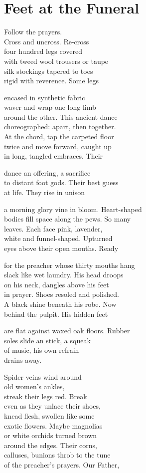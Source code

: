 \documentclass[twoside,10pt]{book}
\begin{document}
\clearpage
\section{Feet at the Funeral}

Follow the prayers.\\
Cross and uncross. Re-cross\\
four hundred legs covered\\
with tweed wool trousers or taupe\\
silk stockings tapered to toes\\
rigid with reverence. Some legs

encased in synthetic fabric\\
waver and wrap one long limb\\
around the other. This ancient dance\\
choreographed: apart, then together.\\
At the chord, tap the carpeted floor\\
twice and move forward, caught up\\
in long, tangled embraces. Their

dance an offering, a sacrifice\\
to distant foot gods. Their best guess\\
at life. They rise in unison

a morning glory vine in bloom. Heart-shaped\\
bodies fill space along the pews. So many\\
leaves. Each face pink, lavender,\\
white and funnel-shaped. Upturned\\
eyes above their open mouths. Ready

for the preacher whose thirty mouths hang\\
slack like wet laundry. His head droops\\
on his neck, dangles above his feet\\
in prayer. Shoes resoled and polished.\\
A black shine beneath his robe. Now\\
behind the pulpit. His hidden feet

are flat against waxed oak floors. Rubber\\
soles slide an stick, a squeak\\
of music, his own refrain\\
drains away.

Spider veins wind around\\
old women's ankles,\\
streak their legs red. Break\\
even as they unlace their shoes,\\
knead flesh, swollen like some\\
exotic flowers. Maybe magnolias\\
or white orchids turned brown\\
around the edges. Their corns,\\
calluses, bunions throb to the tune\\
of the preacher's prayers. Our Father,
\end{document}

